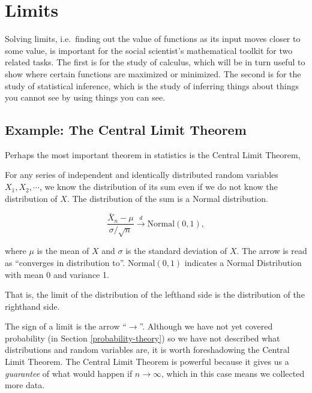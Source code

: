\documentclass[]{book}
\theoremstyle{definition}
\theoremstyle{definition}
\theoremstyle{definition}
\theoremstyle{remark}
\let\BeginKnitrBlock\begin \let\EndKnitrBlock\end
\begin{document}
\hypertarget{limits-precalc}{%
\chapter{Limits}\label{limits-precalc}}

Solving limits, i.e.~finding out the value of functions as its input moves closer to some value, is important for the social scientist's mathematical toolkit for two related tasks. The first is for the study of calculus, which will be in turn useful to show where certain functions are maximized or minimized. The second is for the study of statistical inference, which is the study of inferring things about things you cannot see by using things you can see.

\hypertarget{example-the-central-limit-theorem}{%
\section*{Example: The Central Limit Theorem}\label{example-the-central-limit-theorem}}

Perhaps the most important theorem in statistics is the Central Limit Theorem,

\BeginKnitrBlock{theorem}[Central Limit Theorem (i.i.d. case)]
\protect\hypertarget{thm:clt-lim}{}{\label{thm:clt-lim} {} }For any series of independent and identically distributed random variables \(X_1, X_2, \cdots\), we know the distribution of its sum even if we do not know the distribution of \(X\). The distribution of the sum is a Normal distribution.

\[\frac{\bar{X}_n - \mu}{\sigma / \sqrt{n}} \xrightarrow{d} \text{Normal}(0, 1),\]

where \(\mu\) is the mean of \(X\) and \(\sigma\) is the standard deviation of \(X\). The arrow is read as ``converges in distribution to''. \(\text{Normal}(0, 1)\) indicates a Normal Distribution with mean 0 and variance 1.

That is, the limit of the distribution of the lefthand side is the distribution of the righthand side.
\EndKnitrBlock{theorem}

The sign of a limit is the arrow ``\(\rightarrow\)''. Although we have not yet covered probability (in Section \ref{probability-theory}) so we have not described what distributions and random variables are, it is worth foreshadowing the Central Limit Theorem. The Central Limit Theorem is powerful because it gives us a \emph{guarantee} of what would happen if \(n \rightarrow \infty\), which in this case means we collected more data.
\end{document}
